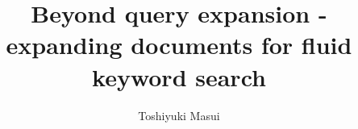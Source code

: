 \documentclass[manuscript,anonymous,review]{acmart}
\begin{document}
\title{Beyond query expansion - expanding documents for fluid keyword search}

\author{Toshiyuki Masui}

\renewcommand{\shortauthors}{Toshiyuki Masui}
\end{document}
